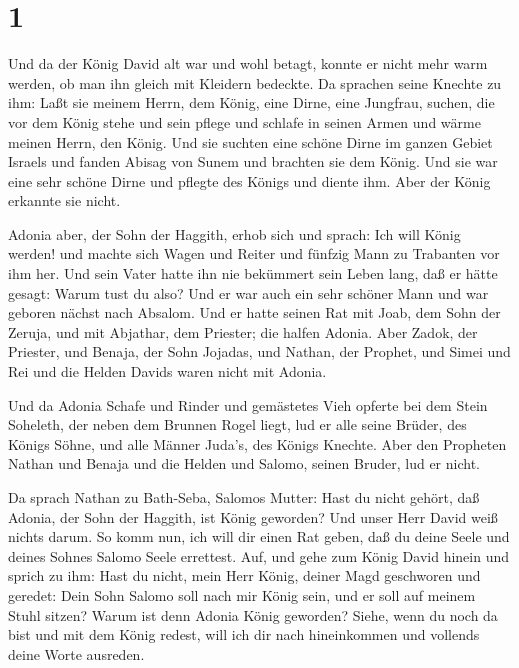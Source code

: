 \hypertarget{section}{%
\section{1}\label{section}}

 Und da der König David alt war und wohl betagt, konnte er
nicht mehr warm werden, ob man ihn gleich mit Kleidern bedeckte.
 Da sprachen seine Knechte zu ihm: Laßt sie meinem Herrn,
dem König, eine Dirne, eine Jungfrau, suchen, die vor dem König stehe
und sein pflege und schlafe in seinen Armen und wärme meinen Herrn, den
König.  Und sie suchten eine schöne Dirne im ganzen Gebiet
Israels und fanden Abisag von Sunem und brachten sie dem König.
 Und sie war eine sehr schöne Dirne und pflegte des Königs
und diente ihm. Aber der König erkannte sie nicht.

 Adonia aber, der Sohn der Haggith, erhob sich und sprach:
Ich will König werden! und machte sich Wagen und Reiter und fünfzig Mann
zu Trabanten vor ihm her.  Und sein Vater hatte ihn nie
bekümmert sein Leben lang, daß er hätte gesagt: Warum tust du also? Und
er war auch ein sehr schöner Mann und war geboren nächst nach Absalom.
 Und er hatte seinen Rat mit Joab, dem Sohn der Zeruja, und
mit Abjathar, dem Priester; die halfen Adonia.  Aber Zadok,
der Priester, und Benaja, der Sohn Jojadas, und Nathan, der Prophet, und
Simei und Rei und die Helden Davids waren nicht mit Adonia.

 Und da Adonia Schafe und Rinder und gemästetes Vieh opferte
bei dem Stein Soheleth, der neben dem Brunnen Rogel liegt, lud er alle
seine Brüder, des Königs Söhne, und alle Männer Juda's, des Königs
Knechte.  Aber den Propheten Nathan und Benaja und die
Helden und Salomo, seinen Bruder, lud er nicht.

 Da sprach Nathan zu Bath-Seba, Salomos Mutter: Hast du
nicht gehört, daß Adonia, der Sohn der Haggith, ist König geworden? Und
unser Herr David weiß nichts darum.  So komm nun, ich will
dir einen Rat geben, daß du deine Seele und deines Sohnes Salomo Seele
errettest.  Auf, und gehe zum König David hinein und sprich
zu ihm: Hast du nicht, mein Herr König, deiner Magd geschworen und
geredet: Dein Sohn Salomo soll nach mir König sein, und er soll auf
meinem Stuhl sitzen? Warum ist denn Adonia König geworden? 
Siehe, wenn du noch da bist und mit dem König redest, will ich dir nach
hineinkommen und vollends deine Worte ausreden.

